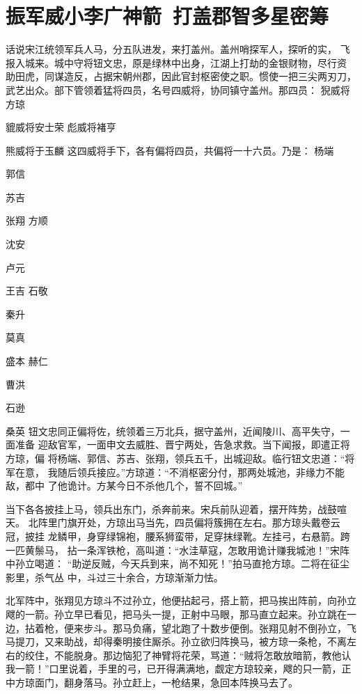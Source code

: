 \chapter{振军威小李广神箭~打盖郡智多星密筹}

话说宋江统领军兵人马，分五队进发，来打盖州。盖州哨探军人，探听的实，
飞报入城来。城中守将钮文忠，原是绿林中出身，江湖上打劫的金银财物，尽行资
助田虎，同谋造反，占据宋朝州郡，因此官封枢密使之职。惯使一把三尖两刃刀，
武艺出众。部下管领着猛将四员，名号四威将，协同镇守盖州。那四员：
猊威将方琼

貔威将安士荣
彪威将褚亨

熊威将于玉麟
这四威将手下，各有偏将四员，共偏将一十六员。乃是：
杨端

郭信

苏吉

张翔
方顺

沈安

卢元

王吉
石敬

秦升

莫真

盛本
赫仁

曹洪

石逊

桑英
钮文忠同正偏将佐，统领着三万北兵，据守盖州，近闻陵川、高平失守，一面准备
迎敌官军，一面申文去威胜、晋宁两处，告急求救。当下闻报，即遣正将方琼，偏
将杨端、郭信、苏吉、张翔，领兵五千，出城迎敌。临行钮文忠道：“将军在意，
我随后领兵接应。”方琼道：“不消枢密分付，那两处城池，非缘力不能敌，都中
了他诡计。方某今日不杀他几个，誓不回城。”

当下各各披挂上马，领兵出东门，杀奔前来。宋兵前队迎着，摆开阵势，战鼓喧天。
北阵里门旗开处，方琼出马当先，四员偏将簇拥在左右。那方琼头戴卷云冠，披挂
龙鳞甲，身穿绿锦袍，腰系狮蛮带，足穿抹绿靴。左挂弓，右悬箭。跨一匹黄鬃马，
拈一条浑铁枪，高叫道：“水洼草寇，怎敢用诡计赚我城池！”宋阵中孙立喝道：
“助逆反贼，今天兵到来，尚不知死！”拍马直抢方琼。二将在征尘影里，杀气丛
中，斗过三十余合，方琼渐渐力怯。

北军阵中，张翔见方琼斗不过孙立，他便拈起弓，搭上箭，把马挨出阵前，向孙立
飕的一箭。孙立早已看见，把马头一提，正射中马眼，那马直立起来。孙立跳在一
边，拈着枪，便来步斗。那马负痛，望北跑了十数步便倒。张翔见射不倒孙立，飞
马提刀，又来助战，却得秦明接住厮杀。孙立欲归阵换马，被方琼一条枪，不离左
右的绞住，不能脱身。那边恼犯了神臂将花荣，骂道：“贼将怎敢放暗箭，教他认
我一箭！”口里说着，手里的弓，已开得满满地，觑定方琼较亲，飕的只一箭，正
中方琼面门，翻身落马。孙立赶上，一枪结果，急回本阵换马去了。

